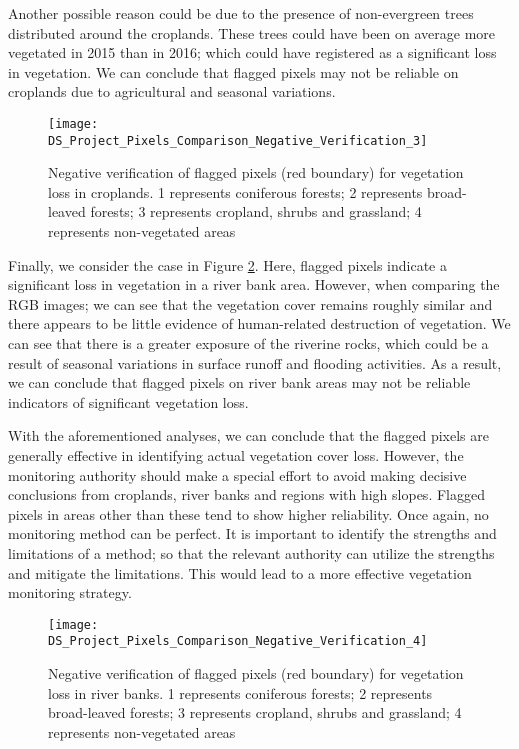 \justify
Another possible reason could be due to the presence of non-evergreen trees distributed around the croplands. These trees could have been on average more vegetated in 2015 than in 2016; which could have registered as a significant loss in vegetation. We can conclude that flagged pixels may not be reliable on croplands due to agricultural and seasonal variations.

\begin{figure}[H]
	\centering
	\texttt{[image: DS\_Project\_Pixels\_Comparison\_Negative\_Verification\_3]}
	\caption[Negative verification of flagged pixels (red boundary) for vegetation loss in croplands]{Negative verification of flagged pixels (red boundary) for vegetation loss in croplands. 1 represents coniferous forests; 2 represents broad-leaved forests; 3 represents cropland, shrubs and grassland; 4 represents non-vegetated areas}
	\label{fig31}
\end{figure}

\justify
Finally, we consider the case in Figure \ref{fig32}. Here, flagged pixels indicate a significant loss in vegetation in a river bank area. However, when comparing the RGB images; we can see that the vegetation cover remains roughly similar and there appears to be little evidence of human-related destruction of vegetation. We can see that there is a greater exposure of the riverine rocks, which could be a result of seasonal variations in surface runoff and flooding activities. As a result, we can conclude that flagged pixels on river bank areas may not be reliable indicators of significant vegetation loss.

\justify
With the aforementioned analyses, we can conclude that the flagged pixels are generally effective in identifying actual vegetation cover loss. However, the monitoring authority should make a special effort to avoid making decisive conclusions from croplands, river banks and regions with high slopes. Flagged pixels in areas other than these tend to show higher reliability. Once again, no monitoring method can be perfect. It is important to identify the strengths and limitations of a method; so that the relevant authority can utilize the strengths and mitigate the limitations. This would lead to a more effective vegetation monitoring strategy.

\begin{figure}[H]
	\centering
	\texttt{[image: DS\_Project\_Pixels\_Comparison\_Negative\_Verification\_4]}
	\caption[Negative verification of flagged pixels (red boundary) for vegetation loss in river banks]{Negative verification of flagged pixels (red boundary) for vegetation loss in river banks. 1 represents coniferous forests; 2 represents broad-leaved forests; 3 represents cropland, shrubs and grassland; 4 represents non-vegetated areas}
	\label{fig32}
\end{figure}

